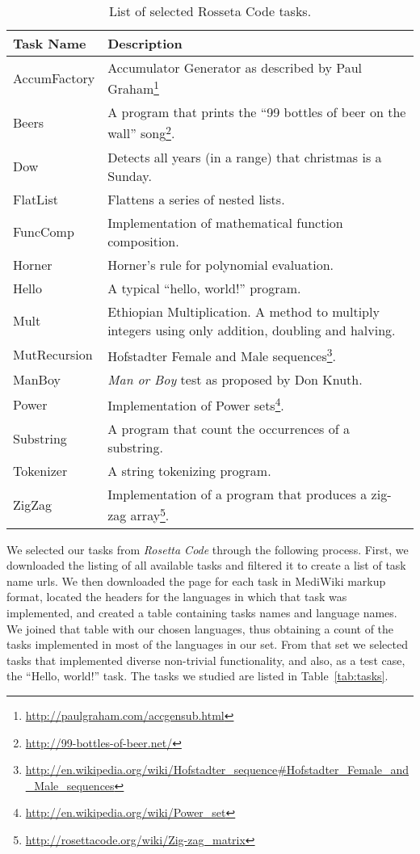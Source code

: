 \documentclass[10pt]{sigplanconf}
\begin{document}
\begin{table}
\begin{center}
\begin{tabular}{ l p{5cm}}
 \hline
Task Name & Description\\
\hline
AccumFactory & Accumulator Generator as described by Paul Graham\footnote{\url{http://paulgraham.com/accgensub.html}}\\
Beers & A program that prints the ``99 bottles of beer on the wall'' song\footnote{\url{http://99-bottles-of-beer.net/}}.\\
Dow & Detects all years (in a range) that christmas is a Sunday.\\
FlatList & Flattens a series of nested lists.\\
FuncComp & Implementation of mathematical function composition.\\
Horner & Horner's rule for polynomial evaluation.\\
Hello & A typical ``hello, world!'' program.\\
Mult & Ethiopian Multiplication. A method to multiply integers using only addition, doubling and halving.\\
MutRecursion & Hofstadter Female and Male sequences\footnote{\url{http://en.wikipedia.org/wiki/Hofstadter_sequence#Hofstadter_Female_and_Male_sequences}}.\\
ManBoy & \textit{Man or Boy} test as proposed by Don Knuth.\\
Power & Implementation of Power sets\footnote{\url{http://en.wikipedia.org/wiki/Power_set}}.\\
Substring & A program that count the occurrences of a substring.\\
Tokenizer & A string tokenizing program.\\
ZigZag & Implementation of a program that produces a zig-zag array\footnote{\url{http://rosettacode.org/wiki/Zig-zag_matrix}}.\\
\hline
\end{tabular}
\end{center}
\caption{List of selected Rosseta Code tasks.}
\label{tab:Tasks}
\end{table}

We selected our tasks from {\em Rosetta Code} through the following process.
First, we downloaded the listing of all available tasks and
filtered it to create a list of task name {\sc url}s.
We then downloaded the page for each task in MediWiki markup format,
located the headers for the languages in which that task was implemented, and
created a table containing tasks names and language names.
We joined that table with our chosen languages,
thus obtaining a count of the tasks implemented in
most of the languages in our set.
From that set we selected tasks that implemented diverse
non-trivial functionality,
and also, as a test case, the ``Hello, world!'' task.
The tasks we studied are listed in Table~\ref{tab:tasks}.
\end{document}
